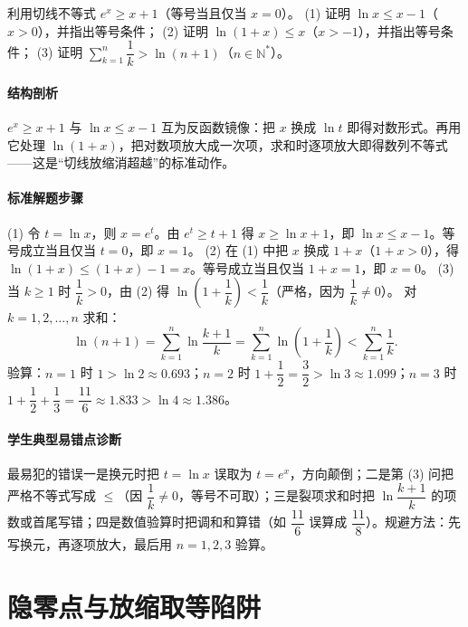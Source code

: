 \begin{problem}
利用切线不等式 $e^x\ge x+1$（等号当且仅当 $x=0$）。
(1) 证明 $\ln x\le x-1$（$x>0$），并指出等号条件；
(2) 证明 $\ln(1+x)\le x$（$x>-1$），并指出等号条件；
(3) 证明 $\sum\limits_{k=1}^n\dfrac1k>\ln(n+1)$（$n\in\mathbb N^*$）。
\end{problem}
\begin{solution}
\paragraph{结构剖析}
$e^x\ge x+1$ 与 $\ln x\le x-1$ 互为反函数镜像：把 $x$ 换成 $\ln t$ 即得对数形式。再用它处理 $\ln(1+x)$，把对数项放大成一次项，求和时逐项放大即得数列不等式——这是“切线放缩消超越”的标准动作。
\paragraph{标准解题步骤}
(1) 令 $t=\ln x$，则 $x=e^t$。由 $e^t\ge t+1$ 得 $x\ge\ln x+1$，即 $\ln x\le x-1$。等号成立当且仅当 $t=0$，即 $x=1$。
(2) 在 (1) 中把 $x$ 换成 $1+x$（$1+x>0$），得 $\ln(1+x)\le(1+x)-1=x$。等号成立当且仅当 $1+x=1$，即 $x=0$。
(3) 当 $k\ge1$ 时 $\dfrac1k>0$，由 (2) 得
$\ln\!\left(1+\dfrac1k\right)<\dfrac1k$（严格，因为 $\dfrac1k\ne0$）。
对 $k=1,2,\dots,n$ 求和：
$$\ln(n+1)=\sum_{k=1}^n\ln\frac{k+1}{k}=\sum_{k=1}^n\ln\!\left(1+\frac1k\right)<\sum_{k=1}^n\frac1k.$$
验算：$n=1$ 时 $1>\ln2\approx0.693$；$n=2$ 时 $1+\dfrac12=\dfrac32>\ln3\approx1.099$；$n=3$ 时 $1+\dfrac12+\dfrac13=\dfrac{11}6\approx1.833>\ln4\approx1.386$。
\paragraph{学生典型易错点诊断}
最易犯的错误一是换元时把 $t=\ln x$ 误取为 $t=e^x$，方向颠倒；二是第 (3) 问把严格不等式写成 $\le$（因 $\dfrac1k\ne0$，等号不可取）；三是裂项求和时把 $\ln\dfrac{k+1}{k}$ 的项数或首尾写错；四是数值验算时把调和和算错（如 $\dfrac{11}6$ 误算成 $\dfrac{11}8$）。规避方法：先写换元，再逐项放大，最后用 $n=1,2,3$ 验算。
\end{solution}

\section{隐零点与放缩取等陷阱}

